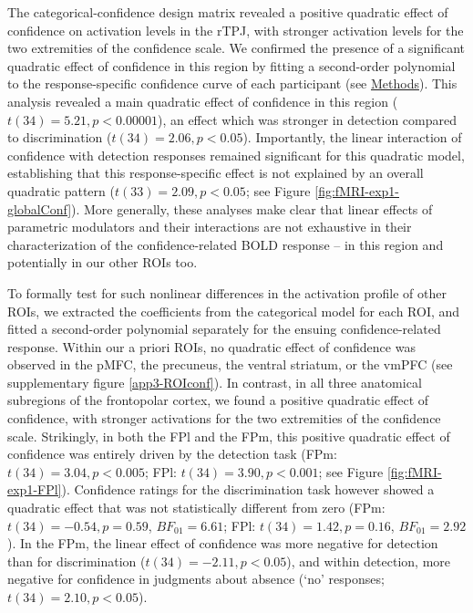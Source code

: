\documentclass[12pt,twoside]{reedthesis}
\begin{document}
The categorical-confidence design matrix revealed a positive quadratic effect of confidence on activation levels in the rTPJ, with stronger activation levels for the two extremities of the confidence scale. We confirmed the presence of a significant quadratic effect of confidence in this region by fitting a second-order polynomial to the response-specific confidence curve of each participant (see \protect\hyperlink{categoricalDM}{Methods}). This analysis revealed a main quadratic effect of confidence in this region (\(t(34) = 5.21, p<0.00001\)), an effect which was stronger in detection compared to discrimination (\(t(34)=2.06, p<0.05\)). Importantly, the linear interaction of confidence with detection responses remained significant for this quadratic model, establishing that this response-specific effect is not explained by an overall quadratic pattern (\(t(33)=2.09, p<0.05\); see Figure \ref{fig:fMRI-exp1-globalConf}). More generally, these analyses make clear that linear effects of parametric modulators and their interactions are not exhaustive in their characterization of the confidence-related BOLD response -- in this region and potentially in our other ROIs too.

To formally test for such nonlinear differences in the activation profile of other ROIs, we extracted the coefficients from the categorical model for each ROI, and fitted a second-order polynomial separately for the ensuing confidence-related response. Within our a priori ROIs, no quadratic effect of confidence was observed in the pMFC, the precuneus, the ventral striatum, or the vmPFC (see supplementary figure \ref{app3-ROIconf}). In contrast, in all three anatomical subregions of the frontopolar cortex, we found a positive quadratic effect of confidence, with stronger activations for the two extremities of the confidence scale. Strikingly, in both the FPl and the FPm, this positive quadratic effect of confidence was entirely driven by the detection task (FPm: \(t(34)=3.04, p<0.005\); FPl: \(t(34)=3.90, p<0.001\); see Figure \ref{fig:fMRI-exp1-FPl}). Confidence ratings for the discrimination task however showed a quadratic effect that was not statistically different from zero (FPm: \(t(34)=-0.54, p=0.59\), \(BF_{01}=6.61\); FPl: \(t(34)=1.42, p=0.16\), \(BF_{01}=2.92\)). In the FPm, the linear effect of confidence was more negative for detection than for discrimination (\(t(34) = -2.11, p<0.05\)), and within detection, more negative for confidence in judgments about absence (`no' responses; \(t(34) = 2.10, p<0.05\)).
\end{document}
